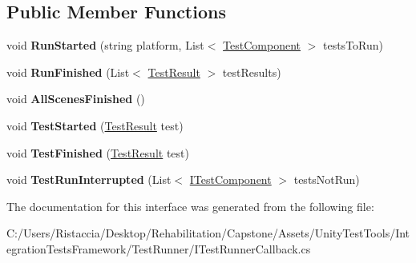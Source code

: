 \subsection*{Public Member Functions}
\begin{DoxyCompactItemize}
\item 
\mbox{\label{interface_unity_test_1_1_integration_test_runner_1_1_i_test_runner_callback_a403dea77fd7a6b9f541c2a37e1169cc5}} 
void {\bfseries Run\+Started} (string platform, List$<$ \hyperlink{class_unity_test_1_1_test_component}{Test\+Component} $>$ tests\+To\+Run)
\item 
\mbox{\label{interface_unity_test_1_1_integration_test_runner_1_1_i_test_runner_callback_a3333da99ceec3782cf52c996a4a9311d}} 
void {\bfseries Run\+Finished} (List$<$ \hyperlink{class_unity_test_1_1_test_result}{Test\+Result} $>$ test\+Results)
\item 
\mbox{\label{interface_unity_test_1_1_integration_test_runner_1_1_i_test_runner_callback_af3c0b155e627d5e02957a1262d90892a}} 
void {\bfseries All\+Scenes\+Finished} ()
\item 
\mbox{\label{interface_unity_test_1_1_integration_test_runner_1_1_i_test_runner_callback_ac148922e50073f9e16f3e05a9c669189}} 
void {\bfseries Test\+Started} (\hyperlink{class_unity_test_1_1_test_result}{Test\+Result} test)
\item 
\mbox{\label{interface_unity_test_1_1_integration_test_runner_1_1_i_test_runner_callback_aafe8a12e04ae61ba598482f1a953f527}} 
void {\bfseries Test\+Finished} (\hyperlink{class_unity_test_1_1_test_result}{Test\+Result} test)
\item 
\mbox{\label{interface_unity_test_1_1_integration_test_runner_1_1_i_test_runner_callback_a154d558bb66e421ca96398a6d95c7efd}} 
void {\bfseries Test\+Run\+Interrupted} (List$<$ \hyperlink{interface_unity_test_1_1_i_test_component}{I\+Test\+Component} $>$ tests\+Not\+Run)
\end{DoxyCompactItemize}


The documentation for this interface was generated from the following file\+:\begin{DoxyCompactItemize}
\item 
C\+:/\+Users/\+Ristaccia/\+Desktop/\+Rehabilitation/\+Capstone/\+Assets/\+Unity\+Test\+Tools/\+Integration\+Tests\+Framework/\+Test\+Runner/I\+Test\+Runner\+Callback.\+cs\end{DoxyCompactItemize}

